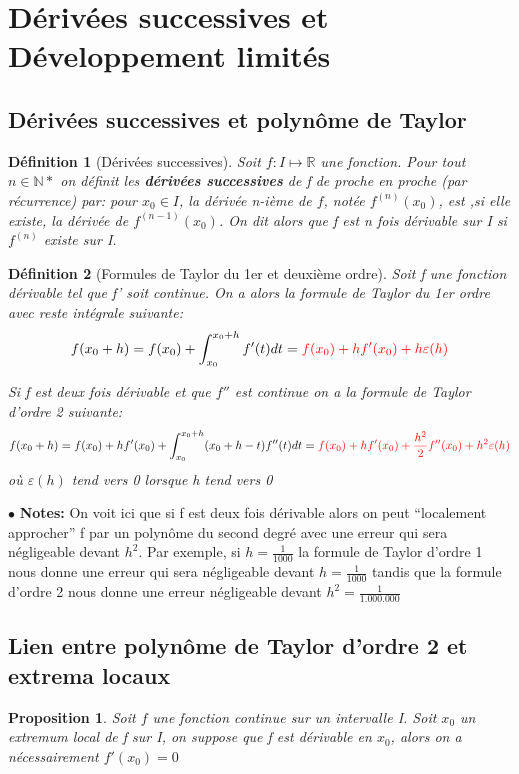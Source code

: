 \documentclass[a4paper]{article}
\theoremstyle{break}
\newtheorem{mydef}{Définition}[section]
\newtheorem{prop}{Proposition}[section]
\newcommand{\R}{\mathbb{R}}
\newcommand{\note}{$\bullet$ \textbf{Notes: }}
\begin{document}
\section{Dérivées successives et Développement limités}

\subsection{Dérivées successives et polynôme de Taylor}
\begin{mydef}[Dérivées successives]
  Soit $f: I \mapsto \R$ une fonction. Pour tout $n \in \mathbb{N}*$ on définit
  les \textbf{dérivées successives} de f de proche en proche (par récurrence)
  par: pour $x_0 \in I$, la dérivée n-ième de $f$, notée $f^{(n)}(x_0)$, est
  ,si elle existe, la dérivée de $f^{(n-1)}(x_0)$. On dit alors que f est n fois
  dérivable sur I si $f^{(n)}$ existe sur I. 
\end{mydef}

\begin{mydef}[Formules de Taylor du 1er et deuxième ordre]
  Soit f une fonction dérivable tel que f' soit continue. On a alors la formule
  de Taylor du 1er ordre avec reste intégrale suivante:
  \[
    f(x_0+h) = f(x_0) + \int_{x_0}^{x_0+h} f'(t) dt = \color{red}{f(x_0) + hf'(x_0) +
    h\varepsilon(h) }
  \]

  Si f est deux fois dérivable et que $f''$ est continue on a la formule de
  Taylor d'ordre 2 suivante:
  \[
    f(x_0+h) = f(x_0) + hf'(x_0) + \int_{x_0}^{x_0+h} (x_0+h-t) f''(t) dt = \color{red}{f(x_0)
    + hf'(x_0) + \frac{h^2}{2} f''(x_0)+ h^2 \varepsilon(h) }
  \]
  où $\varepsilon(h)$ tend vers 0 lorsque h tend vers 0
\end{mydef}

\note On voit ici que si f est deux fois dérivable alors on peut ``localement
approcher'' f par un polynôme du second degré avec une erreur qui sera
négligeable devant $h^2$. Par exemple, si $h=\frac{1}{1000}$ la formule de
Taylor d'ordre 1 nous donne une erreur qui sera négligeable devant $h
=\frac{1}{1000}$ tandis que la formule d'ordre 2 nous donne une erreur
négligeable devant $h^2 = \frac{1}{1.000.000}$

\subsection{Lien entre polynôme de Taylor d'ordre 2 et extrema locaux}
\begin{prop}
  Soit $f$ une fonction continue sur un intervalle I. Soit $x_0$ un
  extremum local de f sur I, on suppose que f est dérivable en $x_0$,
  alors on a nécessairement $f'(x_0) = 0$
\end{prop}
\end{document}
